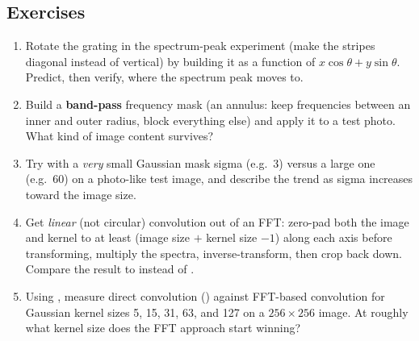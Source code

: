 \subsection*{Exercises}
\begin{enumerate}
  \item Rotate the grating in the spectrum-peak experiment (make the stripes diagonal instead of vertical) by building it as a function of $x\cos\theta + y\sin\theta$. Predict, then verify, where the spectrum peak moves to.
  \item Build a \textbf{band-pass} frequency mask (an annulus: keep frequencies between an inner and outer radius, block everything else) and apply it to a test photo. What kind of image content survives?
  \item Try  with a \emph{very} small Gaussian mask sigma (e.g.\ 3) versus a large one (e.g.\ 60) on a photo-like test image, and describe the trend as sigma increases toward the image size.
  \item Get \emph{linear} (not circular) convolution out of an FFT: zero-pad both the image and kernel to at least (image size $+$ kernel size $- 1$) along each axis before transforming, multiply the spectra, inverse-transform, then crop back down. Compare the result to  instead of .
  \item Using , measure direct convolution () against FFT-based convolution for Gaussian kernel sizes 5, 15, 31, 63, and 127 on a $256\times256$ image. At roughly what kernel size does the FFT approach start winning?
\end{enumerate}

\vfill
{}
